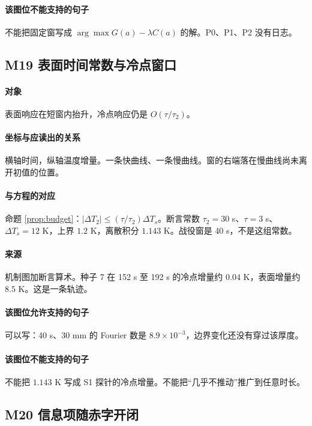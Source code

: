 \paragraph{该图位不能支持的句子}
不能把固定窗写成 $\arg\max G(a)-\lambda C(a)$ 的解。P0、P1、P2 没有日志。

\subsection{M19 表面时间常数与冷点窗口}
\paragraph{对象}
表面响应在短窗内抬升，冷点响应仍是 $O(\tau/\tau_2)$。

\paragraph{坐标与应读出的关系}
横轴时间，纵轴温度增量。一条快曲线、一条慢曲线。窗的右端落在慢曲线尚未离开初值的位置。

\paragraph{与方程的对应}
命题 \ref{prop:budget}：$|\Delta T_2|\le (\tau/\tau_2)\Delta T_s$。断言常数 $\tau_2=30$ s、$\tau=3$ s、$\Delta T_s=12$ K，上界 $1.2$ K，离散积分 $1.143$ K。战役窗是 40 s，不是这组常数。

\paragraph{来源}
机制图加断言算术。种子 7 在 152 s 至 192 s 的冷点增量约 $0.04$ K，表面增量约 $8.5$ K。这是一条轨迹。

\paragraph{该图位允许支持的句子}
可以写：40 s、30 mm 的 Fourier 数是 $8.9\times 10^{-3}$，边界变化还没有穿过该厚度。

\paragraph{该图位不能支持的句子}
不能把 $1.143$ K 写成 S1 探针的冷点增量。不能把“几乎不推动”推广到任意时长。

\subsection{M20 信息项随赤字开闭}
